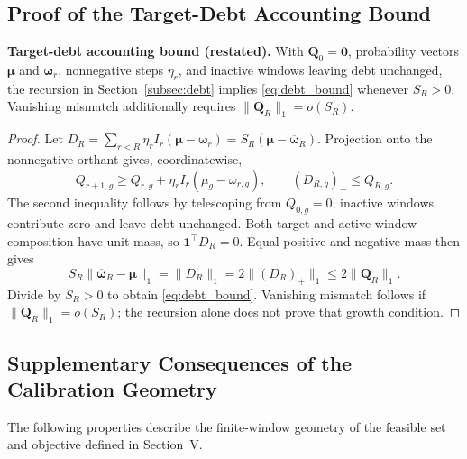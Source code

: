 \subsection{Proof of the Target-Debt Accounting Bound}
\noindent\textbf{Target-debt accounting bound (restated).}
With $\mathbf Q_0=\mathbf0$, probability vectors $\boldsymbol\mu$ and
$\boldsymbol\omega_r$, nonnegative steps $\eta_r$, and inactive windows leaving
debt unchanged, the recursion in Section~\ref{subsec:debt} implies
\eqref{eq:debt_bound} whenever $S_R>0$. Vanishing mismatch additionally requires
$\|\mathbf Q_R\|_1=o(S_R)$.
\begin{proof}

Let $D_R=\sum_{r<R}\eta_rI_r(\boldsymbol\mu-\boldsymbol\omega_r)
=S_R(\boldsymbol\mu-\overline{\boldsymbol\omega}_R)$.
Projection onto the nonnegative orthant gives, coordinatewise,
\begin{equation}
Q_{r+1,g}\ge Q_{r,g}+\eta_rI_r(\mu_g-\omega_{r,g}),
\qquad (D_{R,g})_+\le Q_{R,g}.
\label{eq:app_Q_dominates_D}
\end{equation}
The second inequality follows by telescoping from $Q_{0,g}=0$;
inactive windows contribute zero and leave debt unchanged.
Both target and active-window composition have unit mass, so
$\mathbf1^\top D_R=0$.  Equal positive and negative mass then gives
\begin{equation}
S_R\|\overline{\boldsymbol\omega}_R-\boldsymbol\mu\|_1
=\|D_R\|_1=2\|(D_R)_+\|_1\le2\|\mathbf Q_R\|_1.
\label{eq:app_debt_bound_final}
\end{equation}
Divide by $S_R>0$ to obtain \eqref{eq:debt_bound}.  Vanishing mismatch follows
if $\|\mathbf Q_R\|_1=o(S_R)$; the recursion alone does not prove that
growth condition.
\end{proof}

\subsection{Supplementary Consequences of the Calibration Geometry}

The following properties describe the finite-window geometry of the feasible
set and objective defined in Section~V.

